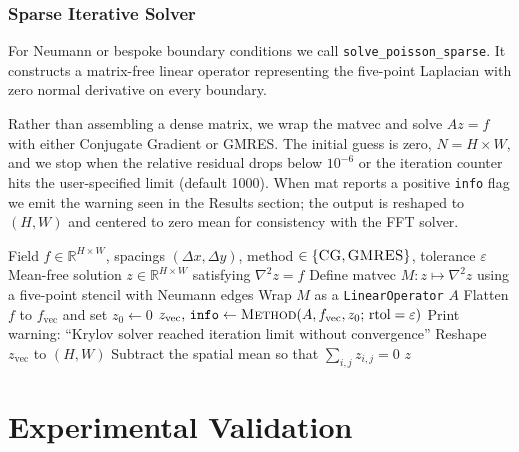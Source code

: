 \documentclass[11pt]{article}
\begin{document}

\subsubsection{Sparse Iterative Solver}

For Neumann or bespoke boundary conditions we call \texttt{solve\_poisson\_sparse}. It constructs a matrix-free linear operator representing the
five-point Laplacian with zero normal derivative on every boundary.

Rather than assembling a dense matrix, we wrap the matvec and solve $Az=f$ with either Conjugate
Gradient or GMRES. The initial guess is zero, $N = H \times W$, and we stop when the relative residual drops below $10^{-6}$ or the
iteration counter hits the user-specified limit (default 1000). When mat reports a positive \texttt{info} flag we emit the warning
seen in the Results section; the output is reshaped to $(H,W)$ and centered to zero mean for consistency with the FFT solver.

\begin{algorithm}[H]
\caption{Sparse Poisson Solver with Neumann Boundary Conditions}
\begin{algorithmic}[1]
\REQUIRE Field $f \in \mathbb{R}^{H \times W}$, spacings $(\Delta x, \Delta y)$, method $\in \{\textsc{CG}, \textsc{GMRES}\}$, tolerance
$\varepsilon$
\ENSURE Mean-free solution $z \in \mathbb{R}^{H \times W}$ satisfying $\nabla^2 z = f$
\STATE Define matvec $M: z \mapsto \nabla^2 z$ using a five-point stencil with Neumann edges
\STATE Wrap $M$ as a \texttt{LinearOperator} $A$
\STATE Flatten $f$ to $f_{\text{vec}}$ and set $z_0 \leftarrow 0$
\STATE $z_{\text{vec}},\,\texttt{info} \leftarrow \textsc{Method}(A, f_{\text{vec}}, z_0;\, \text{rtol}=\varepsilon)$
\STATE Print warning: ``Krylov solver reached iteration limit without convergence''
\ENDIF
\STATE Reshape $z_{\text{vec}}$ to $(H, W)$
\STATE Subtract the spatial mean so that $\sum_{i,j} z_{i,j} = 0$
\RETURN $z$
\end{algorithmic}
\end{algorithm}


\newpage
\section{Experimental Validation}\label{sec:experiments}
\end{document}
